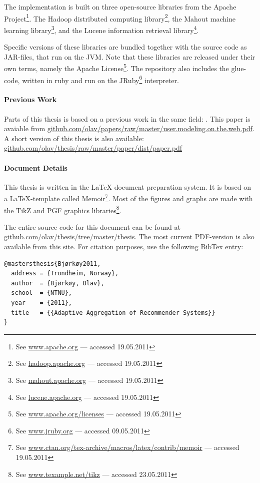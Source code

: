 The implementation is built on three open-source libraries from the
Apache Project\footnote{See \url{www.apache.org} --- accessed 19.05.2011}.
The Hadoop distributed computing library\footnote{See \url{hadoop.apache.org} --- accessed 19.05.2011},
the Mahout machine learning library\footnote{See \url{mahout.apache.org} --- accessed 19.05.2011},
and the Lucene information retrieval library\footnote{See \url{lucene.apache.org} --- accessed 19.05.2011}.

Specific versions of these libraries are bundled together with
the source code as JAR-files, that run on the JVM.
Note that these libraries are released under their own terms,
namely the Apache License\footnote{
See \url{www.apache.org/licenses} --- accessed 19.05.2011}.
The repository also includes the glue-code, written in ruby and run on the JRuby\footnote{
See \url{www.jruby.org} --- accessed 09.05.2011} interpreter.

\paragraph{Previous Work}
Parts of this thesis is based on a previous work in the same field:
\cite{Bjorkoy2010d}. This paper is avaiable from
\url{github.com/olav/papers/raw/master/user.modeling.on.the.web.pdf}.
A short version of this thesis is also available:
\url{github.com/olav/thesis/raw/master/paper/dist/paper.pdf}

\paragraph{Document Details}
This thesis is written in the LaTeX document preparation system.
It is based on a LaTeX-template called Memoir\footnote{
See \url{www.ctan.org/tex-archive/macros/latex/contrib/memoir} --- accessed 19.05.2011}.
Most of the figures and graphs are made with the TikZ and PGF graphics libraries\footnote{
See \url{www.texample.net/tikz} --- accessed 23.05.2011}.

The entire source code for this document can be found at 
\url{github.com/olav/thesis/tree/master/thesis}.
The most current PDF-version is also available from this site.
For citation purposes, use the following BibTex entry:

{
\footnotesize
\begin{verbatim}
@mastersthesis{Bjørkøy2011,
  address = {Trondheim, Norway},
  author  = {Bjørkøy, Olav},
  school  = {NTNU},
  year    = {2011},
  title   = {{Adaptive Aggregation of Recommender Systems}}
} 
\end{verbatim}
}

